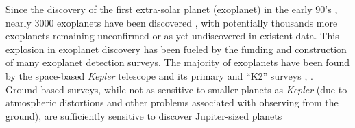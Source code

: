 Since the discovery of the first extra-solar planet (exoplanet) in the early 90's \cite{pulsarplanet}, nearly 3000 exoplanets have been discovered \cite{exoplanetorg}, with potentially thousands more exoplanets remaining unconfirmed or as yet undiscovered in existent data.  This explosion in exoplanet discovery has been fueled by the funding and construction of many exoplanet detection surveys.  The majority of exoplanets have been found by the space-based {\it Kepler} telescope and its primary and ``K2'' surveys \cite{kepler}, \cite{k2}.  Ground-based surveys, while not as sensitive to smaller planets as {\it Kepler} (due to atmospheric distortions and other problems associated with observing from the ground), are sufficiently sensitive to discover Jupiter-sized planets 